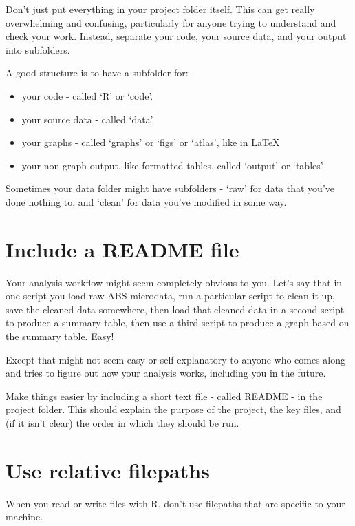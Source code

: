 \documentclass[]{book}
\providecommand{\tightlist}{%
  \setlength{\itemsep}{0pt}\setlength{\parskip}{0pt}}
\begin{document}
Don't just put everything in your project folder itself. This can get really overwhelming and confusing, particularly for anyone trying to understand and check your work. Instead, separate your code, your source data, and your output into subfolders.

A good structure is to have a subfolder for:

\begin{itemize}
\tightlist
\item
  your code - called `R' or `code'.
\item
  your source data - called `data'
\item
  your graphs - called `graphs' or `figs' or `atlas', like in LaTeX
\item
  your non-graph output, like formatted tables, called `output' or `tables'
\end{itemize}

Sometimes your data folder might have subfolders - `raw' for data that you've done nothing to, and `clean' for data you've modified in some way.

\hypertarget{include-a-readme-file}{%
\section{Include a README file}\label{include-a-readme-file}}

Your analysis workflow might seem completely obvious to you. Let's say that in one script you load raw ABS microdata, run a particular script to clean it up, save the cleaned data somewhere, then load that cleaned data in a second script to produce a summary table, then use a third script to produce a graph based on the summary table. Easy!

Except that might not seem easy or self-explanatory to anyone who comes along and tries to figure out how your analysis works, including you in the future.

Make things easier by including a short text file - called README - in the project folder. This should explain the purpose of the project, the key files, and (if it isn't clear) the order in which they should be run.

\hypertarget{use-relative-filepaths}{%
\section{Use relative filepaths}\label{use-relative-filepaths}}

When you read or write files with R, don't use filepaths that are specific to your machine.
\end{document}
